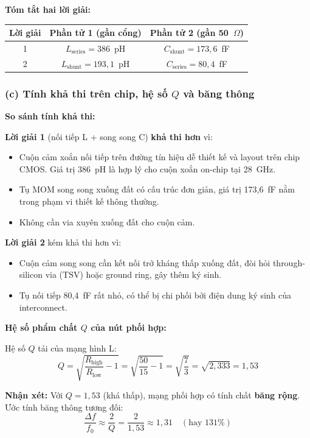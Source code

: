 \documentclass[12pt,a4paper]{article}
\begin{document}
\textbf{Tóm tắt hai lời giải:}

\begin{center}
\begin{tabular}{|c|c|c|}
\hline
\textbf{Lời giải} & \textbf{Phần tử 1 (gần cổng)} & \textbf{Phần tử 2 (gần 50~$\Omega$)} \\
\hline
1 & $L_{\text{series}} = 386$~pH & $C_{\text{shunt}} = 173{,}6$~fF \\
\hline
2 & $L_{\text{shunt}} = 193{,}1$~pH & $C_{\text{series}} = 80{,}4$~fF \\
\hline
\end{tabular}
\end{center}

\subsubsection{(c) Tính khả thi trên chip, hệ số $Q$ và băng thông}

\textbf{So sánh tính khả thi:}

\textbf{Lời giải 1} (nối tiếp L + song song C) \textbf{khả thi hơn} vì:
\begin{itemize}
    \item Cuộn cảm xoắn nối tiếp trên đường tín hiệu dễ thiết kế và layout trên chip CMOS. Giá trị 386~pH là hợp lý cho cuộn xoắn on-chip tại 28~GHz.
    \item Tụ MOM song song xuống đất có cấu trúc đơn giản, giá trị 173{,}6~fF nằm trong phạm vi thiết kế thông thường.
    \item Không cần via xuyên xuống đất cho cuộn cảm.
\end{itemize}

\textbf{Lời giải 2} kém khả thi hơn vì:
\begin{itemize}
    \item Cuộn cảm song song cần kết nối trở kháng thấp xuống đất, đòi hỏi through-silicon via (TSV) hoặc ground ring, gây thêm ký sinh.
    \item Tụ nối tiếp 80{,}4~fF rất nhỏ, có thể bị chi phối bởi điện dung ký sinh của interconnect.
\end{itemize}

\textbf{Hệ số phẩm chất $Q$ của nút phối hợp:}

Hệ số $Q$ tải của mạng hình L:
\[
Q = \sqrt{\frac{R_{\text{high}}}{R_{\text{low}}} - 1} = \sqrt{\frac{50}{15} - 1} = \sqrt{\frac{7}{3}} = \sqrt{2{,}333} = \boxed{1{,}53}
\]

\textbf{Nhận xét:} Với $Q = 1{,}53$ (khá thấp), mạng phối hợp có tính chất \textbf{băng rộng}. Ước tính băng thông tương đối:
\[
\frac{\Delta f}{f_0} \approx \frac{2}{Q} = \frac{2}{1{,}53} \approx 1{,}31 \quad (\text{hay } 131\%)
\]
\end{document}
